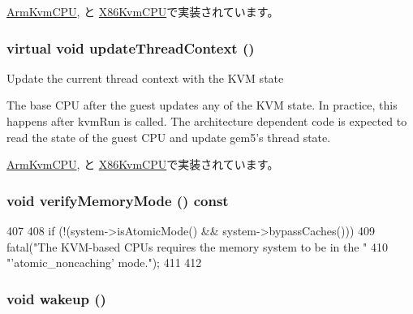 \hyperlink{classArmKvmCPU_a93c6e8c82dfb63c7039f0cbf064fae5d}{ArmKvmCPU}, と \hyperlink{classX86KvmCPU_a93c6e8c82dfb63c7039f0cbf064fae5d}{X86KvmCPU}で実装されています。\hypertarget{classBaseKvmCPU_ac47bfb587580ca76050e0c9bc753c10d}{
\subsubsection[{updateThreadContext}]{\setlength{\rightskip}{0pt plus 5cm}virtual void updateThreadContext ()}}
\label{classBaseKvmCPU_ac47bfb587580ca76050e0c9bc753c10d}
Update the current thread context with the KVM state

The base CPU after the guest updates any of the KVM state. In practice, this happens after kvmRun is called. The architecture dependent code is expected to read the state of the guest CPU and update gem5's thread state. 

\hyperlink{classArmKvmCPU_adbd5e38eae7c8c3021f2c4f430b399fd}{ArmKvmCPU}, と \hyperlink{classX86KvmCPU_adbd5e38eae7c8c3021f2c4f430b399fd}{X86KvmCPU}で実装されています。\hypertarget{classBaseKvmCPU_ae2e1ccebe596a180f8105d57f9a93645}{
\subsubsection[{verifyMemoryMode}]{\setlength{\rightskip}{0pt plus 5cm}void verifyMemoryMode () const}}
\label{classBaseKvmCPU_ae2e1ccebe596a180f8105d57f9a93645}



\begin{DoxyCode}
407 {
408     if (!(system->isAtomicMode() && system->bypassCaches())) {
409         fatal("The KVM-based CPUs requires the memory system to be in the "
410               "'atomic_noncaching' mode.\n");
411     }
412 }
\end{DoxyCode}
\hypertarget{classBaseKvmCPU_ae674290a26ecbd622c5160e38e8a4fe9}{
\subsubsection[{wakeup}]{\setlength{\rightskip}{0pt plus 5cm}void wakeup ()}}
\label{classBaseKvmCPU_ae674290a26ecbd622c5160e38e8a4fe9}


